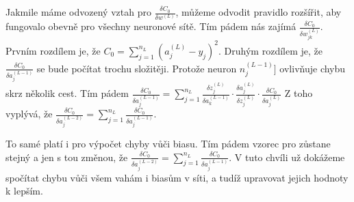 Jakmile máme odvozený vztah pro \(\frac{\delta C_0}{\delta w^{(L)}}\), můžeme odvodit pravidlo rozšířit, aby fungovalo obevně pro všechny neuronové sítě.
Tím pádem nás zajímá \(\frac{\delta C_0}{\delta w_{jk}^{(L)}}\). Prvním rozdílem je, že \(C_0 = \sum_{j=1}^{n_L}(a_j^{(L)} - y_j)^2 \).
Druhým rozdílem je, že \(\frac{\delta C_0}{\delta a_j^{(L-1)}}\) se bude počítat trochu složitěji. Protože neuron \(n_j^{(L-1)}]\) ovlivňuje chybu skrz několik cest.
Tím pádem \(\frac{\delta C_0}{\delta a_j^{(L-1)}} = \sum_{j=1}^{n_L} \frac{\delta z_j^{(L)}}{\delta a_k^{(L-1)}} \cdot \frac{\delta a_j^{(L)}}{\delta z_j^{(L)}} \cdot \frac{\delta C_0}{\delta a_j^(L)}\)
Z toho vyplývá, že \(\frac{\delta C_0}{\delta a_j^{(L-2)}} = \sum_{j=1}^{n_L} \frac{\delta C_0}{\delta a_j^{(L-1)}} \).

To samé platí i pro výpočet chyby vůči biasu. Tím pádem vzorec pro zůstane stejný a jen s tou změnou, že \(\frac{\delta C_0}{\delta a_j^{(L-2)}} = \sum_{j=1}^{n_L} \frac{\delta C_0}{\delta a_j^{(L-1)}} \).
V tuto chvíli už dokážeme spočítat chybu vůči všem vahám i biasům v síti, a tudíž upravovat jejich hodnoty k lepším.